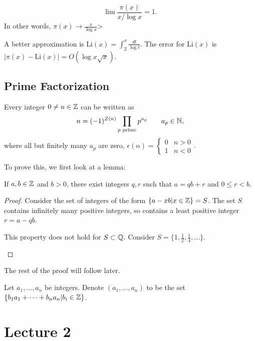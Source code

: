 \documentclass{article}
\begin{document}
\begin{theorem}
    \[\lim \frac{\pi(x)}{x / \log x} = 1.\] In other words, $\pi(x) \to \frac{x}{\log x}$>
\end{theorem}

A better approximation is $\mathrm{Li}(x) = \int_{2}^x \frac{dt}{\log t}$. The error for $\mathrm{Li}(x)$ is $|\pi(x) - \mathrm{Li}(x)| = O(\log x \sqrt x)$.

\subsection{Prime Factorization}
\begin{theorem}
    \label{uniq}
    Every integer $0 \neq n \in \mathbb Z$ can be written as \[n = (-1)^{Z(n)} \prod_{p \text{ prime}} p^{a_p} \qquad a_p \in \mathbb N,\] where all but finitely many $a_p$ are zero, $\epsilon(n) = \begin{cases} 0 & n > 0 \\ 1 & n < 0\end{cases}$.
\end{theorem}

To prove this, we first look at a lemma:
\begin{lemma}
    \label{lemma:1}
    If $a, b \in \mathbb Z$ and $b > 0$, there exist integers $q, r$ such that $a = qb + r$ and $0 \leq r < b$.
\end{lemma}

\begin{proof}
    Consider the set of integers of the form $\{a - xb | x \in \mathbb Z\} = S$. The set $S$ contains infinitely many positive integers, so contains a least positive integer $r = a - qb$.

    \begin{remark}
        This property does not hold for $S \subset \mathbb Q$. Consider $S = \{1, \frac{1}{2}, \frac{1}{4}, \ldots\}$. 
    \end{remark}
\end{proof}

The rest of the proof will follow later.

\begin{definition}
    \label{multset}
    Let $a_1, \ldots, a_n$ be integers. Denote $(a_1, \ldots, a_n)$ to be the set $\{b_1a_1 + \cdots + b_na_n | b_i \in \mathbb Z\}$.
\end{definition}

\section{Lecture 2}
\end{document}
